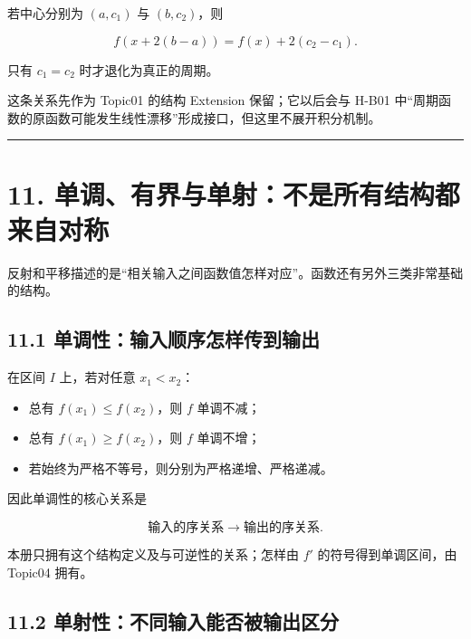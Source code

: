 \documentclass[11pt,a4paper]{ctexart}
\providecommand{\tightlist}{}
\begin{document}
若中心分别为 \((a,c_1)\) 与 \((b,c_2)\)，则

\[
\boxed{f(x+2(b-a))=f(x)+2(c_2-c_1)}.
\]

只有 \(c_1=c_2\) 时才退化为真正的周期。

这条关系先作为 Topic01 的结构 Extension 保留；它以后会与 H-B01
中``周期函数的原函数可能发生线性漂移''形成接口，但这里不展开积分机制。

\begin{center}\rule{0.5\linewidth}{0.5pt}\end{center}

\section{11.
单调、有界与单射：不是所有结构都来自对称}\label{ux5355ux8c03ux6709ux754cux4e0eux5355ux5c04ux4e0dux662fux6240ux6709ux7ed3ux6784ux90fdux6765ux81eaux5bf9ux79f0}

反射和平移描述的是``相关输入之间函数值怎样对应''。函数还有另外三类非常基础的结构。

\subsection{11.1
单调性：输入顺序怎样传到输出}\label{ux5355ux8c03ux6027ux8f93ux5165ux987aux5e8fux600eux6837ux4f20ux5230ux8f93ux51fa}

在区间 \(I\) 上，若对任意 \(x_1<x_2\)：

\begin{itemize}
\tightlist
\item
  总有 \(f(x_1)\le f(x_2)\)，则 \(f\) 单调不减；
\item
  总有 \(f(x_1)\ge f(x_2)\)，则 \(f\) 单调不增；
\item
  若始终为严格不等号，则分别为严格递增、严格递减。
\end{itemize}

因此单调性的核心关系是

\[
\boxed{\text{输入的序关系}\longrightarrow\text{输出的序关系}.}
\]

本册只拥有这个结构定义及与可逆性的关系；怎样由 \(f'\)
的符号得到单调区间，由 Topic04 拥有。

\subsection{11.2
单射性：不同输入能否被输出区分}\label{ux5355ux5c04ux6027ux4e0dux540cux8f93ux5165ux80fdux5426ux88abux8f93ux51faux533aux5206}
\end{document}
